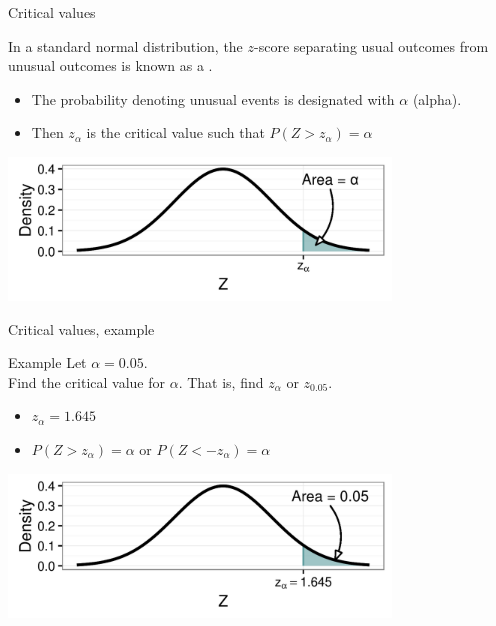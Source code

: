 \documentclass[xcolor=table, handout]{beamer}
\begin{document}
\begin{frame}{Critical values}
\begin{block}{}
{\large In a standard normal distribution, the $z$-score separating usual outcomes from unusual outcomes is known as a .}
\begin{itemize}
\item The probability denoting unusual events is designated with $\alpha$ (alpha).
\item Then $z_\alpha$ is the critical value such that $P(Z > z_\alpha) = \alpha$
\end{itemize}
\end{block}

\medskip
{\centering
\includegraphics[width=4in]{../images/ch6_alpha}
\par}

\end{frame}

\begin{frame}{Critical values, example}
\begin{exampleblock}{Example}
Let $\alpha = 0.05$.\\
\medskip
Find the critical value for $\alpha$. That is, find $z_\alpha$ or $z_{0.05}$.
\begin{itemize}
\pause\item $z_\alpha = 1.645$
\item $P(Z > z_\alpha) = \alpha$ or $P(Z < -z_\alpha) = \alpha$
\end{itemize}
\end{exampleblock}
\smallskip
{\centering
\includegraphics[width=4in]{../images/ch6_crit1}
\par}

\end{frame}
\end{document}
